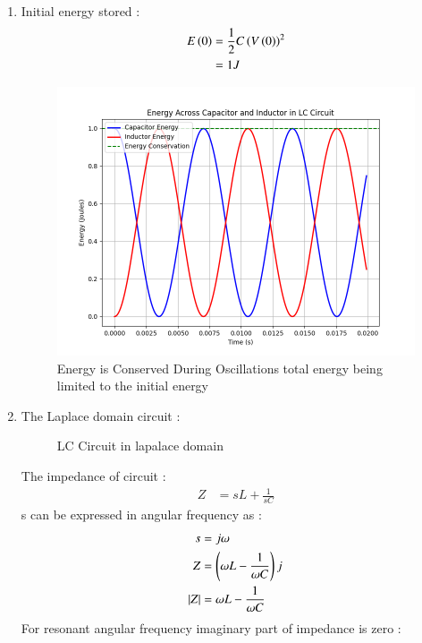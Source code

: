 \documentclass[journal,12pt,twocolumn]{IEEEtran}
\theoremstyle{remark}
\begin{document}
\begin{enumerate}[label=\textbf{(\alph*)}]
    \item Initial energy stored :
    \begin{align}
        E\left(0\right)&= \frac{1}{2}C\left(V\left(0\right)\right)^2\\
            &=  1 J 
    \end{align}
\begin{figure}[H]
    \includegraphics[width=1\columnwidth]{figs/Plot_energy.png}
    \caption{Energy is Conserved During Oscillations total energy being limited to the initial energy}
    \label{fig:energy_plots}
\end{figure}
 \item 
The Laplace domain circuit :
\begin{figure}[H]
    \centering
    \resizebox{0.2\textwidth}{!}{}
    \caption{LC Circuit in lapalace domain}
    \label{fig:ncert_12.7.12_cktdiag_lap}
\end{figure}
The impedance of circuit :
\begin{align}
    Z &= sL + \frac{1}{sC}
\end{align}
s can be expressed in angular frequency as :
\begin{align}
    s &= j\omega\\
    Z &= \left(\omega L - \frac{1}{\omega C}\right)j\\
    \left\vert Z\right\vert &= \omega L - \frac{1}{\omega C}
\end{align}
For resonant angular frequency imaginary part of impedance is zero :
\begin{align}

\end{align}
\end{enumerate}
\end{document}

